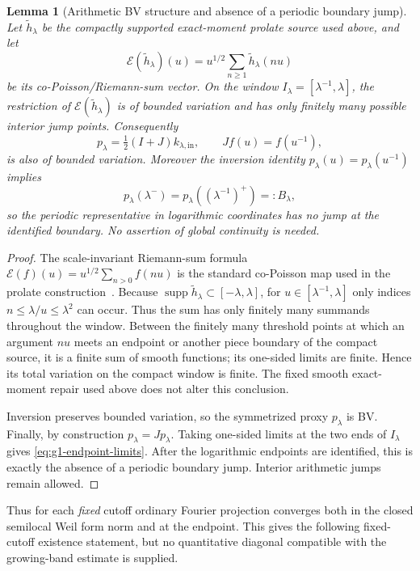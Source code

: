 \documentclass[11pt]{article}
\newtheorem{lemma}[theorem]{Lemma}
\theoremstyle{remark}
\begin{document}
\begin{lemma}[Arithmetic BV structure and absence of a periodic boundary jump]\label{lem:g1-bv-structure}
Let $\widetilde h_\lambda$ be the compactly supported exact-moment prolate source used above, and let
\[
 \mathcal E(\widetilde h_\lambda)(u)
 =u^{1/2}\sum_{n\ge1}\widetilde h_\lambda(nu)
\]
be its co-Poisson/Riemann-sum vector.  On the window
$I_\lambda=[\lambda^{-1},\lambda]$, the restriction of
$\mathcal E(\widetilde h_\lambda)$ is of bounded variation and has only finitely many possible interior jump points.  Consequently
\[
 p_\lambda=\tfrac12(I+J)k_{\lambda,\mathrm{in}},
 \qquad Jf(u)=f(u^{-1}),
\]
is also of bounded variation.  Moreover the inversion identity
$p_\lambda(u)=p_\lambda(u^{-1})$ implies
\begin{equation}\label{eq:g1-endpoint-limits}
 p_\lambda(\lambda^-)=p_\lambda((\lambda^{-1})^+)=:B_\lambda,
\end{equation}
so the periodic representative in logarithmic coordinates has no jump at the identified boundary.  No assertion of global continuity is needed.
\end{lemma}
\begin{proof}
The scale-invariant Riemann-sum formula
$\mathcal E(f)(u)=u^{1/2}\sum_{n>0}f(nu)$ is the standard co-Poisson map used in the prolate construction~\cite{ConnesConsani2023}.  Because
$\operatorname{supp}\widetilde h_\lambda\subset[-\lambda,\lambda]$, for
$u\in[\lambda^{-1},\lambda]$ only indices
$n\le\lambda/u\le\lambda^2$ can occur.  Thus the sum has only finitely many summands throughout the window.  Between the finitely many threshold points at which an argument $nu$ meets an endpoint or another piece boundary of the compact source, it is a finite sum of smooth functions; its one-sided limits are finite.  Hence its total variation on the compact window is finite.  The fixed smooth exact-moment repair used above does not alter this conclusion.

Inversion preserves bounded variation, so the symmetrized proxy $p_\lambda$ is BV.  Finally, by construction $p_\lambda=Jp_\lambda$.  Taking one-sided limits at the two ends of $I_\lambda$ gives \eqref{eq:g1-endpoint-limits}.  After the logarithmic endpoints are identified, this is exactly the absence of a periodic boundary jump.  Interior arithmetic jumps remain allowed.
\end{proof}

Thus for each \emph{fixed} cutoff ordinary Fourier projection converges both in the closed semilocal Weil form norm and at the endpoint.  This gives the following fixed-cutoff existence statement, but no quantitative diagonal compatible with the growing-band estimate is supplied.
\end{document}

